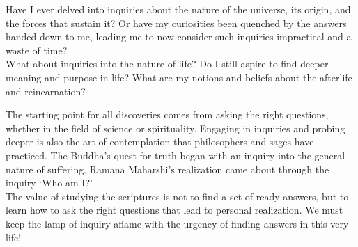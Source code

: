 

\newpage
\begin{mananam}{}
\normalfont\mananamtext Have I ever delved into inquiries about the nature of the universe, its origin, and the forces that sustain it? Or have my curiosities been quenched by the answers handed down to me, leading me to now consider such inquiries impractical and a waste of time?\\
What about inquiries into the nature of life? Do I still aspire to find deeper meaning and purpose in life? What are my notions and beliefs about the afterlife and reincarnation?
\end{mananam}
\sreflect
\begin{inspiration}{}
\normalfont\mananamtext The starting point for all discoveries comes from asking the right questions, whether in the field of science or spirituality. Engaging in inquiries and probing deeper is also the art of contemplation that philosophers and sages have practiced. The Buddha’s quest for truth began with an inquiry into the general nature of suffering. Ramana Maharshi’s realization came about through the inquiry ‘Who am I?’\\
The value of studying the scriptures is not to find a set of ready answers, but to learn how to ask the right questions that lead to personal realization. We must keep the lamp of inquiry aflame with the urgency of finding answers in this very life!
\end{inspiration}
\newpage

